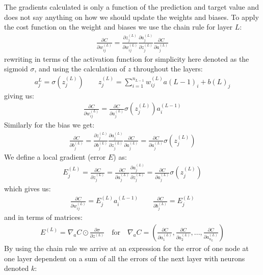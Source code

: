 \documentclass[11pt]{article}
\begin{document}
The gradients calculated is only a function of the prediction and target value and does not say anything on how we should update the weights and biases. To apply the cost function on the weight and biases we use the chain rule for layer $L$:
\begin{align*}
  \frac{\partial C}{\partial w^{(L)}_{ij}}  = \frac{\partial z^{(L)}_j}{\partial w^{(L)}_{ij}}  \frac{\partial a^{(L)}_{j}}{\partial z^{(L)}_j}  \frac{\partial C}{\partial a^{(L)}_j}
\end{align*}
rewriting in terms of the activation function for simplicity here denoted as the sigmoid $\sigma$, and using the calculation of $z$ throughout the layers:
\begin{align*}
  a_j^L = \sigma(z_j^{(L)}) \quad\quad z_j^{(L)} = \sum_{i=1}^{n_{L-1}}w^{(L)}_{ij}a{(L-1)}_{i} + b{(L)}_{j}
\end{align*}
giving us:
\begin{align*}
  \frac{\partial C}{\partial w^{(L)}_{ij}} = \frac{\partial C}{\partial a^{(L)}_{j}}\sigma(z_j^{(L)})a_i^{(L-1)}
\end{align*}
Similarly for the bias we get:
\begin{align*}
  \frac{\partial C}{\partial b^{(L)}_{j}} = \frac{\partial z^{(L)}_j}{\partial b^{(L)}_{j}}  \frac{\partial a^{(L)}_{j}}{\partial z^{(L)}_j}  \frac{\partial C}{\partial a^{(L)}_j} =
  \frac{\partial C}{\partial a^{(L)}_{j}}\sigma(z_j^{(L)})
\end{align*}
We define a local gradient (error $E$) as:
\begin{align*}
  E_j^{(L)} = \frac{\partial C }{\partial z_j^{(L)}} = \frac{\partial C }{\partial a_j^{(L)}}\frac{\partial a_j^{(L)} }{\partial z_j^{(L)}} = \frac{\partial C }{\partial a_j^{(L)}} \sigma(z_j^{(L)})
\end{align*}
which gives us:
\begin{align*}
  \frac{\partial C }{\partial w_{ij}^{(L)}} = E_j^{(L)} a_i^{(L-1)} \quad\quad
  \frac{\partial C }{\partial b_{j}^{(L)}} = E_j^{(L)}
\end{align*}
and in terms of matrices:
\begin{align*}
  E^{(L)} = \nabla_a C \odot \frac{\partial \sigma }{\partial z^{(L)}} \quad \text{for} \quad \nabla_a C = \left(\frac{\partial C }{\partial a_1^{(L)}}, \frac{\partial C }{\partial a_2^{(L)}},..., \frac{\partial C }{\partial a_{n_L}^{(L)}}\right)
\end{align*}
By using the chain rule we arrive at an expression for the error of one node at one layer dependent on a sum of all the errors of the next layer with neurons denoted $k$:
\end{document}
